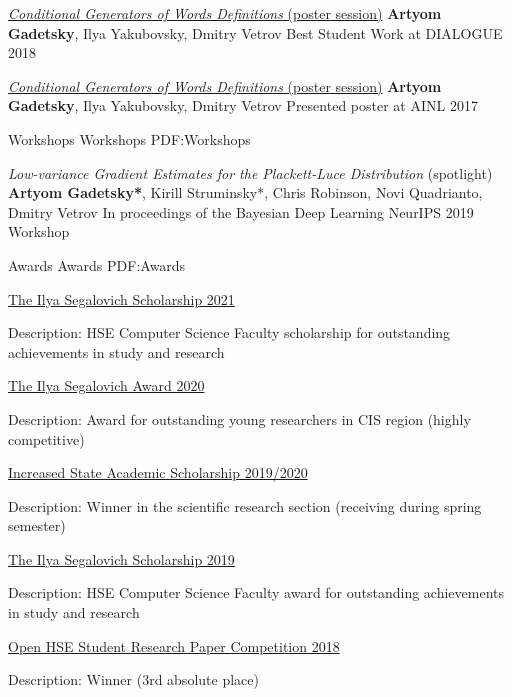 \documentclass[letterpaper,MMMyyyy,nonstopmode]{simpleresumecv}
\begin{document}
\begin{Body}
\Gap
\Item
\href{http://www.dialog-21.ru/en/}{\textit{Conditional Generators of Words Definitions} (poster session)}
\Item
\textbf{Artyom Gadetsky}, Ilya Yakubovsky, Dmitry Vetrov
\Item
Best Student Work at DIALOGUE 2018

\Gap
\Item
\href{http://ainlconf.ru/2017}{\textit{Conditional Generators of Words Definitions} (poster session)}
\Item
\textbf{Artyom Gadetsky}, Ilya Yakubovsky, Dmitry Vetrov
\Item
Presented poster at AINL 2017

\Gap
\SubSection
{Workshops}
{Workshops}
{PDF:Workshops}

\Item
\textit{Low-variance Gradient Estimates for the Plackett-Luce Distribution} (spotlight)
\Item
\textbf{Artyom Gadetsky*}, Kirill Struminsky*, Chris Robinson, Novi Quadrianto, Dmitry Vetrov
\Item
In proceedings of the Bayesian Deep Learning NeurIPS 2019 Workshop

\Section
{Awards}
{Awards}
{PDF:Awards}

\BulletItem
\href{https://cs.hse.ru/en/stipend/}{The Ilya Segalovich Scholarship 2021}
\begin{Detail}
\Item
Description: HSE Computer Science Faculty scholarship for outstanding achievements in study and research
\end{Detail}

\BulletItem
\href{https://yandex.ru/scholarships}{The Ilya Segalovich Award 2020}
\begin{Detail}
\Item
Description: Award for outstanding young researchers in CIS region (highly competitive)
\end{Detail}

\BulletItem
\href{https://www.hse.ru/en/scholarships/academic_raised_demo}{Increased State Academic Scholarship 2019/2020}
\begin{Detail}
\Item
Description: Winner in the scientific research section (receiving during spring semester)
\end{Detail}

\BulletItem
\href{https://cs.hse.ru/en/stipend/}{The Ilya Segalovich Scholarship 2019}
\begin{Detail}
\Item
Description: HSE Computer Science Faculty award for outstanding achievements in study and research
\end{Detail}

\BulletItem
\href{https://nirs.hse.ru/nirs/}{Open HSE Student Research Paper Competition 2018}
\begin{Detail}
\Item
Description: Winner (3rd absolute place)
\end{Detail}


\end{Body}
\end{document}
